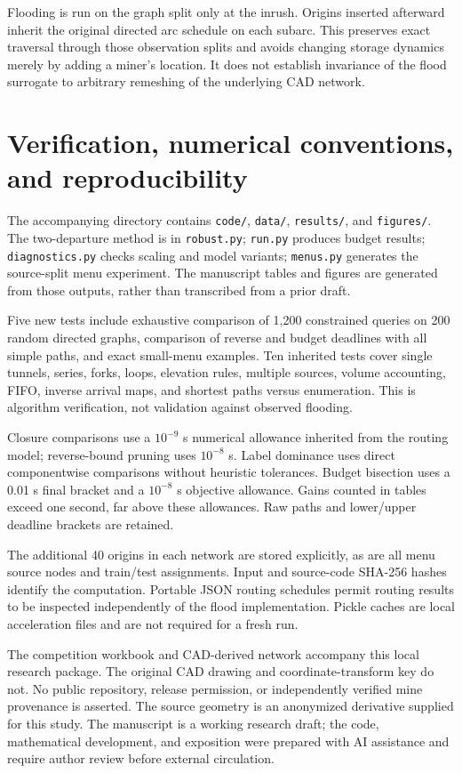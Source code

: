 \documentclass[11pt]{article}
\begin{document}
Flooding is run on the graph split only at the inrush. Origins inserted afterward inherit the original directed arc schedule on each subarc. This preserves exact traversal through those observation splits and avoids changing storage dynamics merely by adding a miner's location. It does not establish invariance of the flood surrogate to arbitrary remeshing of the underlying CAD network.

\section{Verification, numerical conventions, and reproducibility}
The accompanying directory contains \texttt{code/}, \texttt{data/}, \texttt{results/}, and \texttt{figures/}. The two-departure method is in \texttt{robust.py}; \texttt{run.py} produces budget results; \texttt{diagnostics.py} checks scaling and model variants; \texttt{menus.py} generates the source-split menu experiment. The manuscript tables and figures are generated from those outputs, rather than transcribed from a prior draft.

Five new tests include exhaustive comparison of 1,200 constrained queries on 200 random directed graphs, comparison of reverse and budget deadlines with all simple paths, and exact small-menu examples. Ten inherited tests cover single tunnels, series, forks, loops, elevation rules, multiple sources, volume accounting, FIFO, inverse arrival maps, and shortest paths versus enumeration. This is algorithm verification, not validation against observed flooding.

Closure comparisons use a $10^{-9}$ s numerical allowance inherited from the routing model; reverse-bound pruning uses $10^{-8}$ s. Label dominance uses direct componentwise comparisons without heuristic tolerances. Budget bisection uses a 0.01 s final bracket and a $10^{-8}$ s objective allowance. Gains counted in tables exceed one second, far above these allowances. Raw paths and lower/upper deadline brackets are retained.

The additional 40 origins in each network are stored explicitly, as are all menu source nodes and train/test assignments. Input and source-code SHA-256 hashes identify the computation. Portable JSON routing schedules permit routing results to be inspected independently of the flood implementation. Pickle caches are local acceleration files and are not required for a fresh run.

The competition workbook and CAD-derived network accompany this local research package. The original CAD drawing and coordinate-transform key do not. No public repository, release permission, or independently verified mine provenance is asserted. The source geometry is an anonymized derivative supplied for this study. The manuscript is a working research draft; the code, mathematical development, and exposition were prepared with AI assistance and require author review before external circulation.
\end{document}
